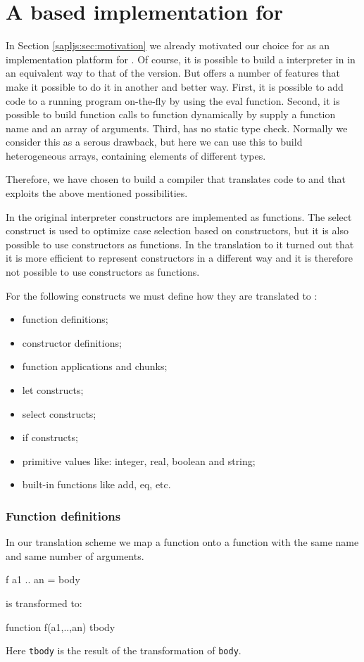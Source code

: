 \section{A \JS based implementation for  \Sapl}\label{sapljs:sec:sapljs}
In Section \ref{sapljs:sec:motivation} we already motivated our choice for \JS as an implementation platform for \Sapl.
Of course, it is possible to build a \Sapl interpreter in \JS in an equivalent way to that of the \Java version.
But \JS offers a number of features that make it possible to do it in another and better way.
First, it is possible to add \JS code to a running \JS program on-the-fly by using the \textsf{eval} function.
Second, it is possible to build function calls to \JS function dynamically by supply a function name and an array of arguments.
Third, \JS has no static type check. Normally we consider this as a serous drawback, but here we can use this to build heterogeneous arrays,
containing elements of different types.

Therefore, we have chosen to build a compiler that translates \Sapl code to \JS and that exploits the above mentioned possibilities.

In the original \Sapl interpreter constructors are implemented as functions.
The \textsf{select} construct is used to optimize case selection based on constructors,
but it is also possible to use constructors as functions.
In the translation to \JS it turned out that it is more efficient to represent constructors in 
a different way and it is therefore not possible to use constructors as functions. 

For the following \Sapl constructs we must define how they are translated to \JS:
\begin{itemize}
	\item function definitions;
	\item constructor definitions;
	\item function applications and chunks;
	\item let constructs;
	\item select constructs;
	\item if constructs;
	\item primitive values like: integer, real, boolean and string;
	\item built-in functions like add, eq, etc.
\end{itemize}

\subsubsection{Function definitions} 
In our translation scheme we map a \Sapl function onto a \JS function with the same name and same number of arguments.
\begin{CleanCode}
f a1 .. an = body
\end{CleanCode}
is transformed to:
\begin{CleanCode}
function f(a1,..,an) { tbody }
\end{CleanCode}
Here \texttt{tbody} is the result of the transformation of \texttt{body}.

